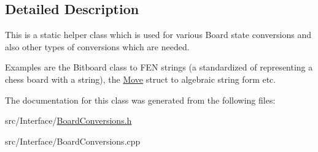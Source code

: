 \subsection{Detailed Description}
This is a static helper class which is used for various Board state conversions and also other types of conversions which are needed. 

Examples are the Bitboard class to F\+EN strings (a standardized of representing a chess board with a string), the \hyperlink{structMove}{Move} struct to algebraic string form etc. 

The documentation for this class was generated from the following files\+:\begin{DoxyCompactItemize}
\item 
src/\+Interface/\hyperlink{BoardConversions_8h}{Board\+Conversions.\+h}\item 
src/\+Interface/Board\+Conversions.\+cpp\end{DoxyCompactItemize}
